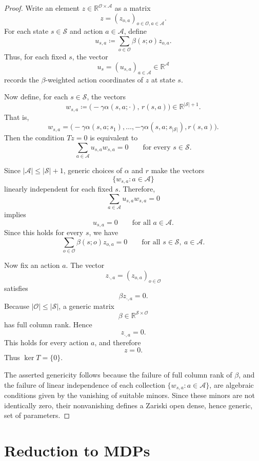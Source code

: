 \documentclass{article}
\theoremstyle{definition}
\theoremstyle{remark}
\begin{document}
\begin{proof}
Write an element \(z\in\mathbb R^{\mathcal O\times\mathcal A}\) as a matrix
\[
z=(z_{o,a})_{o\in\mathcal O, a\in\mathcal A}.
\]
For each state \(s\in\mathcal S\) and action \(a\in\mathcal A\), define
\[
u_{s,a}
\coloneqq
\sum_{o\in\mathcal O}\beta(s;o)z_{o,a}.
\]
Thus, for each fixed \(s\), the vector
\[
u_s=(u_{s,a})_{a\in\mathcal A}\in\mathbb R^{\mathcal A}
\]
records the \(\beta\)-weighted action coordinates of \(z\) at state \(s\).

Now define, for each \(s\in\mathcal S\), the vectors
\[
w_{s,a}
\coloneqq
\bigl(-\gamma\alpha(s,a;\cdot),\, r(s,a)\bigr)
\in \mathbb R^{\vert \mathcal S\vert +1}.
\]
That is,
\[
w_{s,a}
=
\bigl(
-\gamma\alpha(s,a;s_1),
\ldots,
-\gamma\alpha(s,a;s_{\vert \mathcal S\vert }),
r(s,a)
\bigr).
\]
Then the condition \(Tz=0\) is equivalent to
\[
\sum_{a\in\mathcal A} u_{s,a} w_{s,a}=0
\qquad
\text{for every }s\in\mathcal S.
\]

Since \(\vert \mathcal A\vert \leq \vert \mathcal S\vert +1\), generic choices of \(\alpha\) and \(r\) make the vectors
\[
\{w_{s,a}:a\in\mathcal A\}
\]
linearly independent for each fixed \(s\). Therefore,
\[
\sum_{a\in\mathcal A} u_{s,a}w_{s,a}=0
\]
implies
\[
u_{s,a}=0
\qquad
\text{for all }a\in\mathcal A.
\]
Since this holds for every \(s\), we have
\[
\sum_{o\in\mathcal O}\beta(s;o)z_{o,a}=0
\qquad
\text{for all }s\in\mathcal S,\ a\in\mathcal A.
\]

Now fix an action \(a\). The vector
\[
z_{\cdot,a}=(z_{o,a})_{o\in\mathcal O}
\]
satisfies
\[
\beta z_{\cdot,a}=0.
\]
Because \(\vert \mathcal O\vert \leq \vert \mathcal S\vert \), a generic matrix
\[
\beta\in\mathbb R^{\mathcal S\times\mathcal O}
\]
has full column rank. Hence
\[
z_{\cdot,a}=0.
\]
This holds for every action \(a\), and therefore
\[
z=0.
\]
Thus \(\ker T=\{0\}\).

The asserted genericity follows because the failure of full column rank of $\beta$, and the failure of linear independence of each collection \(\{w_{s,a}:a\in\mathcal A\}\), are algebraic conditions given by the vanishing of suitable minors. Since these minors are not identically zero, their nonvanishing defines a Zariski open dense, hence generic, set of parameters.
\end{proof}


\newpage 
\section{Reduction to MDPs} 
\label{app:reduction-MDP}
\end{document}
